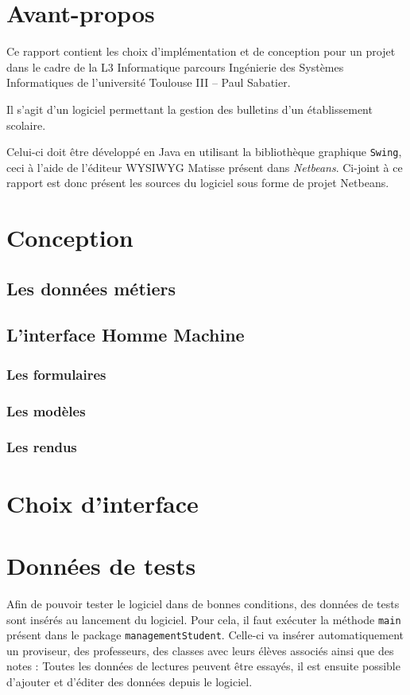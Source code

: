 \documentclass[12pt,a4paper,openany]{book}
\begin{document}
	\thispagestyle{empty} %
	\titleBC 
	\setcounter{tocdepth}{2}
	\setcounter{secnumdepth}{3}
	\chapter*{Avant-propos}
	Ce rapport contient les choix d'implémentation et de conception pour un projet dans le cadre de la L3 Informatique parcours Ingénierie des Systèmes
	Informatiques de l'université Toulouse III -- Paul Sabatier.

	Il s'agit d'un logiciel permettant la gestion des bulletins d'un établissement scolaire.

	Celui-ci doit être développé en Java en utilisant la bibliothèque graphique \texttt{Swing}, ceci à l'aide de l'éditeur WYSIWYG Matisse présent dans
	\textit{Netbeans}. Ci-joint à ce rapport est donc présent les sources du logiciel sous forme de projet Netbeans.

	\tableofcontents
	\chapter{Conception}
		\section{Les données métiers}
		\section{L'interface Homme Machine}
			\subsection{Les formulaires}
			\subsection{Les modèles}
			\subsection{Les rendus}
	\chapter{Choix d'interface}
	\chapter{Données de tests}
	Afin de pouvoir tester le logiciel dans de bonnes conditions, des données de tests sont insérés au lancement du logiciel. Pour cela, il faut
	exécuter la méthode \texttt{main} présent dans le package \texttt{managementStudent}. Celle-ci va insérer automatiquement un proviseur, des
	professeurs, des classes avec leurs élèves associés ainsi que des notes : Toutes les données de lectures peuvent être essayés, il est ensuite
	possible d'ajouter et d'éditer des données depuis le logiciel.
\end{document}
